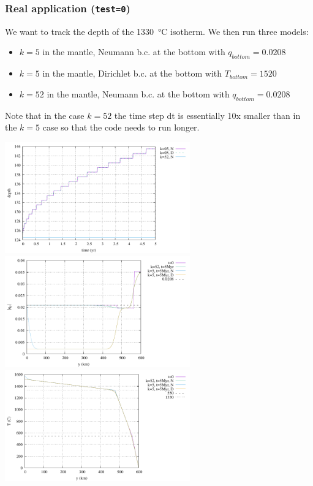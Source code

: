 \subsubsection*{Real application ({\tt test=0})}

We want to track the depth of the 1330~\si{\celsius} isotherm.
We then run three models:
\begin{itemize}
\item $k=5$ in the mantle, Neumann b.c. at the bottom with $q_{bottom}=0.0208$  
\item $k=5$ in the mantle, Dirichlet b.c. at the bottom with $T_{bottom}=1520$  
\item $k=52$ in the mantle, Neumann b.c. at the bottom with $q_{bottom}=0.0208$  
\end{itemize}
Note that in the case $k=52$ the time step dt is essentially 10x smaller than in the 
$k=5$ case so that the code needs to run longer.

\begin{center}
\includegraphics[width=8cm]{python_codes/fieldstone_141/results/test0/depth}
\includegraphics[width=8cm]{python_codes/fieldstone_141/results/test0/heat_flux}\\
\includegraphics[width=8cm]{python_codes/fieldstone_141/results/test0/temperature}
\end{center}

